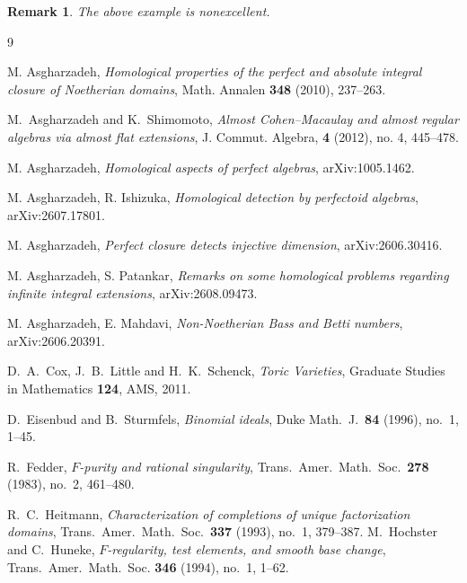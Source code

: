 \documentclass[11pt,a4paper]{amsart}
\numberwithin{equation}{section}
\newtheorem{remark}[theorem]{Remark}
\begin{document}
\begin{remark}
The above example is nonexcellent. 
\end{remark}


 
\begin{thebibliography}{9}


M. Asgharzadeh, \emph{Homological properties of the perfect and absolute integral closure of Noetherian domains}, Math. Annalen {\bf 348} (2010), 237--263.

M.~Asgharzadeh and K.~Shimomoto,
\emph{Almost Cohen--Macaulay and almost regular algebras via almost
	flat extensions}, 
J. Commut. Algebra,
{\bf 4} (2012), no. 4, 445--478.




 M. Asgharzadeh,   \emph{Homological aspects of perfect algebras}, arXiv:1005.1462.



M. Asgharzadeh, R. Ishizuka, 
\emph{Homological detection by perfectoid algebras},  	arXiv:2607.17801.


{M. Asgharzadeh}, \emph{Perfect closure detects injective dimension},  arXiv:2606.30416.
		
 M. Asgharzadeh,  S. Patankar, {\it Remarks on some homological problems regarding infinite integral extensions}, arXiv:2608.09473.


M. Asgharzadeh, E. Mahdavi, \emph{Non-Noetherian Bass and Betti numbers},   arXiv:2606.20391.



D.~A.~Cox, J.~B.~Little and H.~K.~Schenck,
\emph{Toric Varieties},
Graduate Studies in Mathematics \textbf{124}, AMS, 2011.



D.~Eisenbud and B.~Sturmfels,
\emph{Binomial ideals},
Duke Math.~J.~\textbf{84} (1996), no.~1, 1--45.

R.~Fedder,
\emph{$F$-purity and rational singularity},
Trans.~Amer.~Math.~Soc.~\textbf{278} (1983), no.~2, 461--480.


R.~C.~Heitmann,
\emph{Characterization of completions of unique factorization domains},
Trans.~Amer.~Math.~Soc.~\textbf{337} (1993), no.~1, 379--387.
M.~Hochster and C.~Huneke,
\emph{$F$-regularity, test elements, and smooth base change},
Trans.~Amer.~Math.~Soc. \textbf{346} (1994), no.~1, 1--62.






\end{thebibliography}
\end{document}
